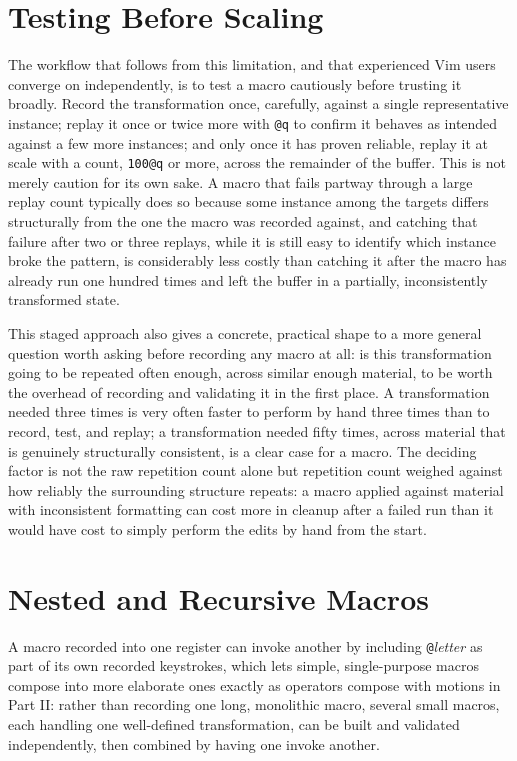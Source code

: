 \section{Testing Before Scaling}

The workflow that follows from this limitation, and that experienced Vim users converge on independently, is to test a macro cautiously before trusting it broadly. Record the transformation once, carefully, against a single representative instance; replay it once or twice more with \texttt{@q} to confirm it behaves as intended against a few more instances; and only once it has proven reliable, replay it at scale with a count, \texttt{100@q} or more, across the remainder of the buffer. This is not merely caution for its own sake. A macro that fails partway through a large replay count typically does so because some instance among the targets differs structurally from the one the macro was recorded against, and catching that failure after two or three replays, while it is still easy to identify which instance broke the pattern, is considerably less costly than catching it after the macro has already run one hundred times and left the buffer in a partially, inconsistently transformed state.

This staged approach also gives a concrete, practical shape to a more general question worth asking before recording any macro at all: is this transformation going to be repeated often enough, across similar enough material, to be worth the overhead of recording and validating it in the first place. A transformation needed three times is very often faster to perform by hand three times than to record, test, and replay; a transformation needed fifty times, across material that is genuinely structurally consistent, is a clear case for a macro. The deciding factor is not the raw repetition count alone but repetition count weighed against how reliably the surrounding structure repeats: a macro applied against material with inconsistent formatting can cost more in cleanup after a failed run than it would have cost to simply perform the edits by hand from the start.

\section{Nested and Recursive Macros}

A macro recorded into one register can invoke another by including \texttt{@}\textit{letter} as part of its own recorded keystrokes, which lets simple, single-purpose macros compose into more elaborate ones exactly as operators compose with motions in Part II: rather than recording one long, monolithic macro, several small macros, each handling one well-defined transformation, can be built and validated independently, then combined by having one invoke another.

